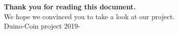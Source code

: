 \documentclass[14pt, a4paper, twoside, openany, dvipsnames]{extreport}
\begin{document}
\begin{justify}
\textbf{Thank you for reading this document.} \\
We hope we convinced you to take a look at our project.
\\[0.5cm]
\small
\textcolor{title_orange}{Duino-Coin project 2019-\the\year}
\end{justify}
\end{document}
